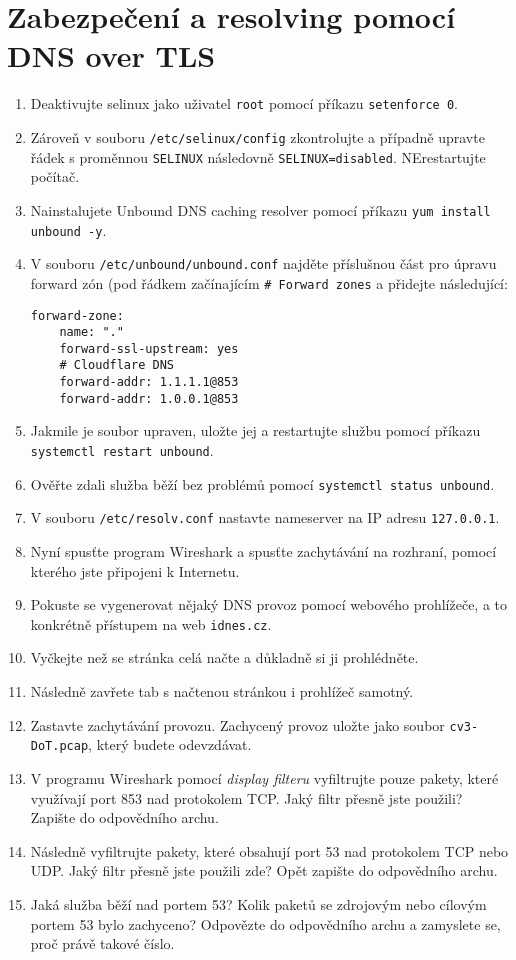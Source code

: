 \section{Zabezpečení a resolving pomocí DNS over TLS}
\label{sec:dot}
\begin{enumerate}
    \item Deaktivujte selinux jako uživatel \texttt{root} pomocí příkazu \texttt{setenforce 0}.
	\item Zároveň v souboru \texttt{/etc/selinux/config} zkontrolujte a případně upravte řádek s proměnnou \texttt{SELINUX} následovně \texttt{SELINUX=disabled}. NErestartujte počítač.
    \item Nainstalujete Unbound DNS caching resolver pomocí příkazu \texttt{yum install unbound -y}.
    \item V souboru \texttt{/etc/unbound/unbound.conf} najděte příslušnou část pro úpravu forward zón (pod řádkem začínajícím \texttt{\# Forward zones} a přidejte následující:
    
\begin{verbatim}
forward-zone:
    name: "."
    forward-ssl-upstream: yes
    # Cloudflare DNS
    forward-addr: 1.1.1.1@853
    forward-addr: 1.0.0.1@853
\end{verbatim}

    \item Jakmile je soubor upraven, uložte jej a restartujte službu pomocí příkazu \texttt{systemctl restart unbound}.
    \item Ověřte zdali služba běží bez problémů pomocí \texttt{systemctl status unbound}.
    \item V souboru \texttt{/etc/resolv.conf} nastavte nameserver na IP adresu \texttt{127.0.0.1}.
    \item Nyní spusťte program Wireshark a spusťte zachytávání na rozhraní, pomocí kterého jste připojeni k Internetu.
    \item Pokuste se vygenerovat nějaký DNS provoz pomocí webového prohlížeče, a to konkrétně přístupem na web \texttt{idnes.cz}.
    \item Vyčkejte než se stránka celá načte a důkladně si ji prohlédněte.
    \item Následně zavřete tab s načtenou stránkou i prohlížeč samotný.
    \item Zastavte zachytávání provozu. Zachycený provoz uložte jako soubor \texttt{cv3-DoT.pcap}, který budete odevzdávat.
    \item V programu Wireshark pomocí \emph{display filteru} vyfiltrujte pouze pakety, které využívají port 853 nad protokolem TCP. Jaký filtr přesně jste použili? Zapište do odpovědního archu.
    \item Následně vyfiltrujte pakety, které obsahují port 53 nad protokolem TCP nebo UDP. Jaký filtr přesně jste použili zde? Opět zapište do odpovědního archu.
	\item Jaká služba běží nad portem 53? Kolik paketů se zdrojovým nebo cílovým portem 53 bylo zachyceno? Odpovězte do odpovědního archu a zamyslete se, proč právě takové číslo.
\end{enumerate}


